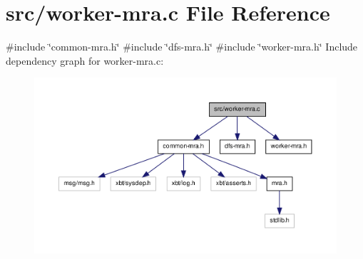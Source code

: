 \hypertarget{worker-mra_8c}{\section{src/worker-\/mra.c \-File \-Reference}
\label{worker-mra_8c}
}
{\ttfamily \#include \char`\"{}common-\/mra.\-h\char`\"{}}\*
{\ttfamily \#include \char`\"{}dfs-\/mra.\-h\char`\"{}}\*
{\ttfamily \#include \char`\"{}worker-\/mra.\-h\char`\"{}}\*
\-Include dependency graph for worker-\/mra.c\-:\nopagebreak
\begin{figure}[H]
\begin{center}
\leavevmode
\includegraphics[width=350pt]{worker-mra_8c__incl}
\end{center}
\end{figure}
